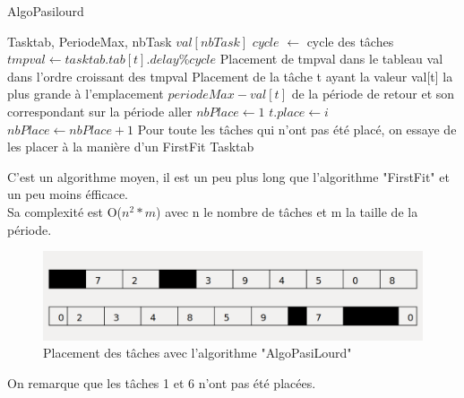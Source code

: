 \documentclass[11pt]{article}
\begin{document}
\begin{algorithm}
    \caption{AlgoPasilourd}
    \begin{algorithmic}
    \REQUIRE Tasktab, PeriodeMax, nbTask
    \STATE $val[nbTask]$
    \STATE $cycle$ $\leftarrow$ cycle des tâches
        \STATE $tmpval \leftarrow tasktab.tab[t].delay\%cycle$
        \STATE Placement de tmpval dans le tableau val dans l'ordre croissant des tmpval
    \ENDFOR
    \STATE Placement de la tâche t ayant la valeur val[t] la plus grande à l'emplacement $periodeMax - val[t]$ de la période de retour et son correspondant sur la période aller
    \STATE $nbPlace \leftarrow 1$
                        \STATE $t.place \leftarrow i$
                    \ENDIF
                \ENDFOR
                \STATE $nbPlace \leftarrow nbPlace+1$
            \ENDIF
        \ENDFOR
    \ENDFOR
    \STATE Pour toute les tâches qui n'ont pas été placé, on essaye de les placer à la manière d'un FirstFit
    \RETURN Tasktab
    \end{algorithmic}
\end{algorithm}

C'est un algorithme moyen, il est un peu plus long que l'algorithme "FirstFit" et un peu moins éfficace.\\
Sa complexité est O($n^2*m$) avec n le nombre de tâches et m la taille de la période.\\

\begin{figure}[!ht]
    \center
    \includegraphics[scale = 0.35]{AlgoPasiLourd}
    \caption{Placement des tâches avec l'algorithme "AlgoPasiLourd"}
\end{figure}

On remarque que les tâches 1 et 6 n'ont pas été placées.\\
\end{document}
